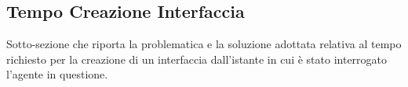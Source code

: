 \subsection{Tempo Creazione Interfaccia}

Sotto-sezione che riporta la problematica e la soluzione adottata relativa al tempo richiesto per la creazione di un interfaccia dall'istante in cui è stato interrogato l'agente in questione.
